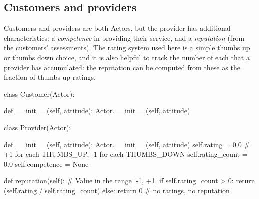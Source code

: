 \documentclass[
  letterpaper,
  DIV=11,
  numbers=noendperiod]{scrartcl}
\newenvironment{Shaded}{\begin{snugshade}}{\end{snugshade}}
\newcommand{\CommentTok}[1]{\textcolor[rgb]{0.37,0.37,0.37}{#1}}
\newcommand{\ControlFlowTok}[1]{\textcolor[rgb]{0.00,0.23,0.31}{#1}}
\newcommand{\DecValTok}[1]{\textcolor[rgb]{0.68,0.00,0.00}{#1}}
\newcommand{\FloatTok}[1]{\textcolor[rgb]{0.68,0.00,0.00}{#1}}
\newcommand{\FunctionTok}[1]{\textcolor[rgb]{0.28,0.35,0.67}{#1}}
\newcommand{\KeywordTok}[1]{\textcolor[rgb]{0.00,0.23,0.31}{#1}}
\newcommand{\NormalTok}[1]{\textcolor[rgb]{0.00,0.23,0.31}{#1}}
\newcommand{\OperatorTok}[1]{\textcolor[rgb]{0.37,0.37,0.37}{#1}}
\newcommand{\VariableTok}[1]{\textcolor[rgb]{0.07,0.07,0.07}{#1}}
\begin{document}
\hypertarget{customers-and-providers}{%
\subsection{Customers and providers}\label{customers-and-providers}}

Customers and providers are both Actors, but the provider has additional
characteristics: a \emph{competence} in providing their service, and a
\emph{reputation} (from the customers' assessments). The rating system
used here is a simple thumbs up or thumbs down choice, and it is also
helpful to track the number of each that a provider has accumulated: the
reputation can be computed from these as the fraction of thumbs up
ratings.

\begin{Shaded}
\begin{Highlighting}[]
\KeywordTok{class}\NormalTok{ Customer(Actor):}

    \KeywordTok{def} \FunctionTok{\_\_init\_\_}\NormalTok{(}\VariableTok{self}\NormalTok{, attitude):}
\NormalTok{        Actor.}\FunctionTok{\_\_init\_\_}\NormalTok{(}\VariableTok{self}\NormalTok{, attitude)}
        
\KeywordTok{class}\NormalTok{ Provider(Actor):}
    
    \KeywordTok{def} \FunctionTok{\_\_init\_\_}\NormalTok{(}\VariableTok{self}\NormalTok{, attitude):}
\NormalTok{        Actor.}\FunctionTok{\_\_init\_\_}\NormalTok{(}\VariableTok{self}\NormalTok{, attitude)}
        \VariableTok{self}\NormalTok{.rating }\OperatorTok{=} \FloatTok{0.0} \CommentTok{\# +1 for each THUMBS\_UP, {-}1 for each THUMBS\_DOWN}
        \VariableTok{self}\NormalTok{.rating\_count }\OperatorTok{=} \FloatTok{0.0}
        \VariableTok{self}\NormalTok{.competence }\OperatorTok{=} \VariableTok{None}
        
    \KeywordTok{def}\NormalTok{ reputation(}\VariableTok{self}\NormalTok{):}
        \CommentTok{\# Value in the range [{-}1, +1]}
        \ControlFlowTok{if} \VariableTok{self}\NormalTok{.rating\_count }\OperatorTok{\textgreater{}} \DecValTok{0}\NormalTok{:}
            \ControlFlowTok{return}\NormalTok{ (}\VariableTok{self}\NormalTok{.rating }\OperatorTok{/} \VariableTok{self}\NormalTok{.rating\_count)}
        \ControlFlowTok{else}\NormalTok{:}
            \ControlFlowTok{return} \DecValTok{0} \CommentTok{\# no ratings, no reputation}
\end{Highlighting}
\end{Shaded}
\end{document}

